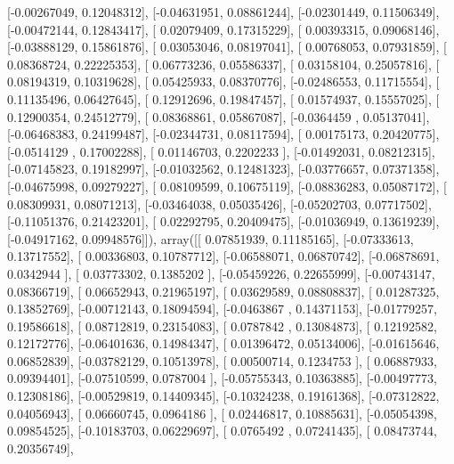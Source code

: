 \documentclass{article}
\begin{document}
       [-0.00267049,  0.12048312],
       [-0.04631951,  0.08861244],
       [-0.02301449,  0.11506349],
       [-0.00472144,  0.12843417],
       [ 0.02079409,  0.17315229],
       [ 0.00393315,  0.09068146],
       [-0.03888129,  0.15861876],
       [ 0.03053046,  0.08197041],
       [ 0.00768053,  0.07931859],
       [ 0.08368724,  0.22225353],
       [ 0.06773236,  0.05586337],
       [ 0.03158104,  0.25057816],
       [ 0.08194319,  0.10319628],
       [ 0.05425933,  0.08370776],
       [-0.02486553,  0.11715554],
       [ 0.11135496,  0.06427645],
       [ 0.12912696,  0.19847457],
       [ 0.01574937,  0.15557025],
       [ 0.12900354,  0.24512779],
       [ 0.08368861,  0.05867087],
       [-0.0364459 ,  0.05137041],
       [-0.06468383,  0.24199487],
       [-0.02344731,  0.08117594],
       [ 0.00175173,  0.20420775],
       [-0.0514129 ,  0.17002288],
       [ 0.01146703,  0.2202233 ],
       [-0.01492031,  0.08212315],
       [-0.07145823,  0.19182997],
       [-0.01032562,  0.12481323],
       [-0.03776657,  0.07371358],
       [-0.04675998,  0.09279227],
       [ 0.08109599,  0.10675119],
       [-0.08836283,  0.05087172],
       [ 0.08309931,  0.08071213],
       [-0.03464038,  0.05035426],
       [-0.05202703,  0.07717502],
       [-0.11051376,  0.21423201],
       [ 0.02292795,  0.20409475],
       [-0.01036949,  0.13619239],
       [-0.04917162,  0.09948576]]), array([[ 0.07851939,  0.11185165],
       [-0.07333613,  0.13717552],
       [ 0.00336803,  0.10787712],
       [-0.06588071,  0.06870742],
       [-0.06878691,  0.0342944 ],
       [ 0.03773302,  0.1385202 ],
       [-0.05459226,  0.22655999],
       [-0.00743147,  0.08366719],
       [ 0.06652943,  0.21965197],
       [ 0.03629589,  0.08808837],
       [ 0.01287325,  0.13852769],
       [-0.00712143,  0.18094594],
       [-0.0463867 ,  0.14371153],
       [-0.01779257,  0.19586618],
       [ 0.08712819,  0.23154083],
       [ 0.0787842 ,  0.13084873],
       [ 0.12192582,  0.12172776],
       [-0.06401636,  0.14984347],
       [ 0.01396472,  0.05134006],
       [-0.01615646,  0.06852839],
       [-0.03782129,  0.10513978],
       [ 0.00500714,  0.1234753 ],
       [ 0.06887933,  0.09394401],
       [-0.07510599,  0.0787004 ],
       [-0.05755343,  0.10363885],
       [-0.00497773,  0.12308186],
       [-0.00529819,  0.14409345],
       [-0.10324238,  0.19161368],
       [-0.07312822,  0.04056943],
       [ 0.06660745,  0.0964186 ],
       [ 0.02446817,  0.10885631],
       [-0.05054398,  0.09854525],
       [-0.10183703,  0.06229697],
       [ 0.0765492 ,  0.07241435],
       [ 0.08473744,  0.20356749],
\end{document}
